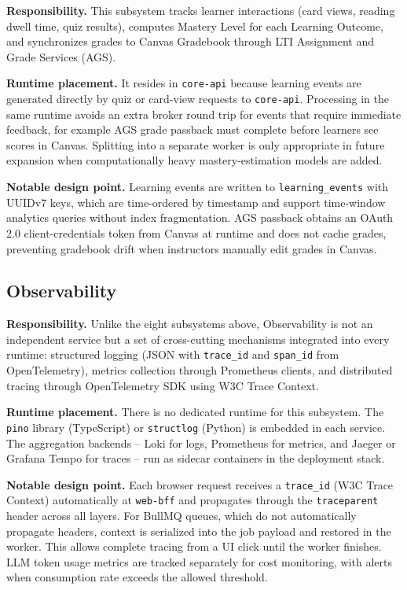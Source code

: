 \textbf{Responsibility.} This subsystem tracks learner interactions
(card views, reading dwell time, quiz results), computes Mastery Level
for each Learning Outcome, and synchronizes grades to Canvas Gradebook
through LTI Assignment and Grade Services (AGS).

\textbf{Runtime placement.} It resides in \texttt{core-api} because
learning events are generated directly by quiz or card-view requests to
\texttt{core-api}. Processing in the same runtime avoids an extra broker
round trip for events that require immediate feedback, for example AGS
grade passback must complete before learners see scores in Canvas.
Splitting into a separate worker is only appropriate in future expansion
when computationally heavy mastery-estimation models are added.

\textbf{Notable design point.} Learning events are written to
\texttt{learning\_events} with UUIDv7 keys, which are time-ordered by
timestamp and support time-window analytics queries without index
fragmentation. AGS passback obtains an OAuth 2.0 client-credentials token
from Canvas at runtime and does not cache grades, preventing gradebook
drift when instructors manually edit grades in Canvas.

\subsection{Observability}

\textbf{Responsibility.} Unlike the eight subsystems above, Observability
is not an independent service but a set of cross-cutting mechanisms
integrated into every runtime: structured logging (JSON with
\texttt{trace\_id} and \texttt{span\_id} from OpenTelemetry), metrics
collection through Prometheus clients, and distributed tracing through
OpenTelemetry SDK using W3C Trace Context.

\textbf{Runtime placement.} There is no dedicated runtime for this
subsystem. The \texttt{pino} library (TypeScript) or \texttt{structlog}
(Python) is embedded in each service. The aggregation backends -- Loki for
logs, Prometheus for metrics, and Jaeger or Grafana Tempo for traces --
run as sidecar containers in the deployment stack.

\textbf{Notable design point.} Each browser request receives a
\texttt{trace\_id} (W3C Trace Context) automatically at \texttt{web-bff}
and propagates through the \texttt{traceparent} header across all layers.
For BullMQ queues, which do not automatically propagate headers, context
is serialized into the job payload and restored in the worker. This allows
complete tracing from a UI click until the worker finishes. LLM token
usage metrics are tracked separately for cost monitoring, with alerts
when consumption rate exceeds the allowed threshold.

